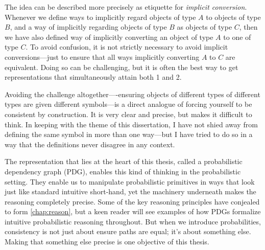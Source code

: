 The idea can be described more precisely as etiquette for \emph{implicit conversion}.
Whenever we define ways to implicitly regard objects of type $A$ to objects of type $B$, and a way of implicitly regarding objects of type
    $B$ as objects of type $C$, then 
    we have also defined way of implicitly converting an object of type $A$ to one of type $C$.
%
To avoid confusion, it is not strictly necessary to avoid implicit conversions---just to ensure that all ways implicitly converting $A$ to $C$ are equivalent. 
%
Doing so can be challenging, but it is often the best way to get representations that simultaneously attain both 1 and 2. 
%

Avoiding the challenge altogether----ensuring objects of different types of different types are given different symbols---is a direct analogue of forcing yourself to be consistent by construction. It is very clear and precise, but makes it difficult to think. 
%
In keeping with the theme of this dissertation, I have not shied away from defining the same symbol in more than one way---but I have tried to do so in a way that the definitions never disagree in any context. 
%

    

The representation that lies at the heart of this thesis, called a probabilistic dependency graph (PDG), enables this kind of thinking in the probabilistic setting.
They enable us to manipulate probabilistic primitives in ways that look just like standard intuitive short-hand, yet the machinery underneath makes the reasoning completely precise.
Some of the key reasoning principles have conjealed to form \cref{chap:reason},
but a keen reader will see examples of how PDGs formalize intuitive probabilistic reasoning throughout. 
But when we introduce probabilities, consistency is not just about ensure paths are equal;
 it's about something else. 
Making that something else precise is one objective of this thesis. 
%


